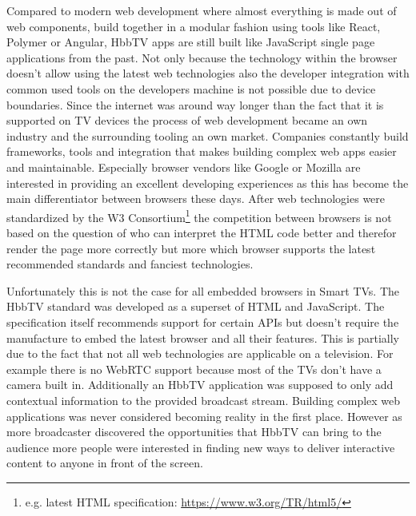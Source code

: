 Compared to modern web development where almost everything is made out of web components, build together in a modular fashion using tools like React, Polymer or Angular, HbbTV apps are still built like JavaScript single page applications from the past. Not only because the technology within the browser doesn't allow using the latest web technologies also the developer integration with common used tools on the developers machine is not possible due to device boundaries. Since the internet was around way longer than the fact that it is supported on TV devices the process of web development became an own industry and the surrounding tooling an own market. Companies constantly build frameworks, tools and integration that makes building complex web apps easier and maintainable. Especially browser vendors like Google or Mozilla are interested in providing an excellent developing experiences as this has become the main differentiator between browsers these days. After web technologies were standardized by the W3 Consortium\footnote{e.g. latest HTML specification: \url{https://www.w3.org/TR/html5/}} the competition between browsers is not based on the question of who can interpret the HTML code better and therefor render the page more correctly but more which browser supports the latest recommended standards and fanciest technologies.

Unfortunately this is not the case for all embedded browsers in Smart TVs. The HbbTV standard was developed as a superset of HTML and JavaScript. The specification itself recommends support for certain APIs but doesn't require the manufacture to embed the latest browser and all their features. This is partially due to the fact that not all web technologies are applicable on a television. For example there is no WebRTC support because most of the TVs don't have a camera built in. Additionally an HbbTV application was supposed to only add contextual information to the provided broadcast stream. Building complex web applications was never considered becoming reality in the first place. However as more broadcaster discovered the opportunities that HbbTV can bring to the audience more people were interested in finding new ways to deliver interactive content to anyone in front of the screen.

